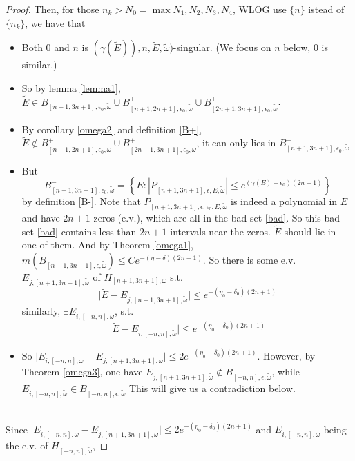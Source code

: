 \begin{proof}
Then, for those $n_k>N_0=\max{N_1,N_2,N_3,N_4}$, WLOG use $\{n\}$ istead of $\{n_k\}$, we have that
\begin{itemize}
  \item Both $0$ and $n$ is $(\gamma(\tilde{E})),n,\tilde{E},\tilde{\omega})$-singular. (We focus on $n$ below, $0$ is similar.)
  \item So by lemma \ref{lemma1},  $\tilde{E}\in B_{[n+1,3n+1],\epsilon_0,\tilde{\omega}}^-\cup B_{[n+1,2n+1],\epsilon_0,\tilde{\omega}}^+\cup B_{[2n+1,3n+1],\epsilon_0,\tilde{\omega}}^+$.
  \item By corollary \ref{omega2} and definition \ref{B+}, $\tilde{E}\notin B_{[n+1,2n+1],\epsilon_0,\tilde{\omega}}^+\cup B_{[2n+1,3n+1],\epsilon_0,\tilde{\omega}}^+$, it can only lies in $B_{[n+1,3n+1],\epsilon_0,\tilde{\omega}}^-$
  \item But
  \begin{equation}\label{bad}
    B_{[n+1,3n+1],\epsilon_0,\tilde{\omega}}^-= \left\{E:|P_{[n+1,3n+1],\epsilon,E,\tilde{\omega}}|\leq e^{(\gamma(E)-\epsilon_0)(2n+1)}\right\}
  \end{equation}
  by definition \ref{B-}.
   Note that $P_{[n+1,3n+1],\epsilon,\epsilon_0,E,\tilde{\omega}}$ is indeed a polynomial in $E$ and have $2n+1$ zeros (e.v.), which are all in the bad set \eqref{bad}. So this bad set \eqref{bad} contains less than $2n+1$ intervals near the zeros. $\tilde{E}$ should lie in one of them. And by Theorem \ref{omega1}, $m(B_{[n+1,3n+1],\epsilon,\tilde{\omega}}^-)\leq Ce^{-(\eta-\delta)(2n+1)}$. So there is some e.v. $E_{j,[n+1,3n+1],\tilde{\omega}}$ of $H_{[n+1,3n+1],\omega}$ s.t.
   \[
   \vert\tilde{E}-E_{j,[n+1,3n+1],\tilde{\omega}}\vert\leq e^{-(\eta_0-\delta_0)(2n+1)}
   \]
   similarly, $\exists E_{i,[-n,n],\tilde{\omega}}$, s.t.
   \[
   \vert\tilde{E}-E_{i,[-n,n],\tilde{\omega}}\vert\leq e^{-(\eta_0-\delta_0)(2n+1)}
   \]
   \item So $\vert E_{i,[-n,n],\tilde{\omega}}-E_{j,[n+1,3n+1],\tilde{\omega}}\vert\leq 2e^{-(\eta_0-\delta_0)(2n+1)}$. However, by Theorem \ref{omega3}, one have $E_{j,[n+1,3n+1],\tilde{\omega}}\notin B_{[-n,n],\epsilon,\tilde{\omega}}$, while $E_{i,[-n,n],\tilde{\omega}}\in B_{[-n,n],\epsilon,\tilde{\omega}}$
   This will give us a contradiction below.
\end{itemize}
~\\
Since $\vert E_{i,[-n,n],\tilde{\omega}}-E_{j,[n+1,3n+1],\tilde{\omega}}\vert\leq 2e^{-(\eta_0-\delta_0)(2n+1)}$ and $E_{i,[-n,n],\tilde{\omega}}$ being the e.v. of $H_{[-n,n],\tilde{\omega}}$,

\end{proof}
